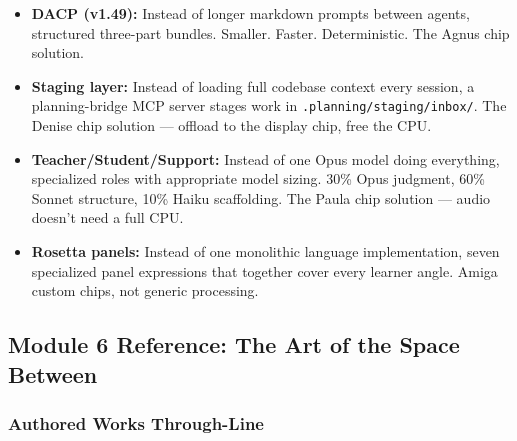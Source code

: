 \documentclass[11pt,letterpaper]{article}
\begin{document}
\begin{itemize}[noitemsep]
  \item \textbf{DACP (v1.49):} Instead of longer markdown prompts between agents, structured
  three-part bundles. Smaller. Faster. Deterministic. The Agnus chip solution.

  \item \textbf{Staging layer:} Instead of loading full codebase context every session, a
  planning-bridge MCP server stages work in \texttt{.planning/staging/inbox/}. The Denise chip
  solution --- offload to the display chip, free the CPU.

  \item \textbf{Teacher/Student/Support:} Instead of one Opus model doing everything, specialized
  roles with appropriate model sizing. 30\% Opus judgment, 60\% Sonnet structure, 10\% Haiku
  scaffolding. The Paula chip solution --- audio doesn't need a full CPU.

  \item \textbf{Rosetta panels:} Instead of one monolithic language implementation, seven
  specialized panel expressions that together cover every learner angle. Amiga custom chips,
  not generic processing.
\end{itemize}

\subsection{Module 6 Reference: The Art of the Space Between}

\subsubsection{Authored Works Through-Line}
\end{document}
